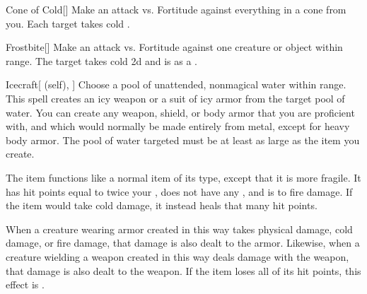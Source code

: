 \lowercase{\hypertarget{spell:Cone of Cold}{}}\label{spell:Cone of Cold}
\begin{freeability}[\nth{1}]{\hypertarget{spell:Cone of Cold}{Cone of Cold}}[]
Make an attack vs. Fortitude against everything in a \areamed cone from you.
\hit Each target takes cold .
\end{freeability}
\vspace{0.25em}



\lowercase{\hypertarget{spell:Frostbite}{}}\label{spell:Frostbite}
\begin{freeability}[\nth{1}]{\hypertarget{spell:Frostbite}{Frostbite}}[]
Make an attack vs. Fortitude against one creature or object within \rngmed range.
\hit The target takes cold  \minus2d and is  as a .
\end{freeability}
\vspace{0.25em}



\lowercase{\hypertarget{spell:Icecraft}{}}\label{spell:Icecraft}
\begin{attuneability}[\nth{1}]{\hypertarget{spell:Icecraft}{Icecraft}}[ (self), ]
Choose a pool of unattended, nonmagical water within \rngclose range.
This spell creates an icy weapon or a suit of icy armor from the target pool of water.
You can create any weapon, shield, or body armor that you are proficient with, and which would normally be made entirely from metal, except for heavy body armor.
The pool of water targeted must be at least as large as the item you create.

The item functions like a normal item of its type, except that it is more fragile.
It has hit points equal to twice your , does not have any , and is  to fire damage.
If the item would take cold damage, it instead heals that many hit points.

When a creature wearing armor created in this way takes physical damage, cold damage, or fire damage, that damage is also dealt to the armor.
Likewise, when a creature wielding a weapon created in this way deals damage with the weapon, that damage is also dealt to the weapon.
If the item loses all of its hit points, this effect is .
\end{attuneability}
\vspace{0.25em}



